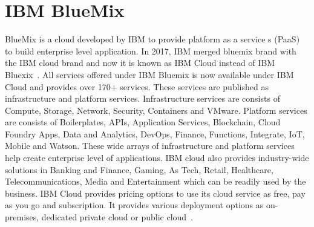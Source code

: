 \section{IBM BlueMix}
BlueMix is a cloud developed by IBM to provide platform as a service
s (PaaS) to build enterprise level application. In 2017, IBM merged
bluemix brand with the IBM cloud brand and now it is known as IBM
Cloud instead of IBM Bluexix~\cite{hid-sp18-402-www-ibm-blog}. All
services offered under IBM Bluemix is now available under IBM Cloud
and provides over 170+ services. These services are published as
infrastructure and platform services. Infrastructure services are
consists of Compute, Storage, Network, Security, Containers and
VMware. Platform services are consists of Boilerplates, APIs,
Application Services, Blockchain, Cloud Foundry Apps, Data and
Analytics, DevOps, Finance, Functions, Integrate, IoT, Mobile and
Watson. These wide arrays of infrastructure and platform services help
create enterprise level of applications. IBM cloud also provides
industry-wide solutions in Banking and Finance, Gaming, As Tech,
Retail, Healthcare, Telecommunications, Media and Entertainment which
can be readily used by the business. IBM Cloud provides pricing
options to use its cloud service as free, pay as you go and
subscription. It provides various deployment options as on-premises,
dedicated private cloud or public cloud~\cite{hid-sp18-402-www-ibm}.

